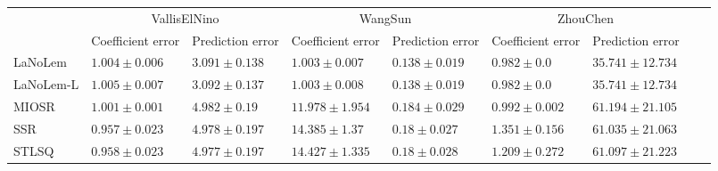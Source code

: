 \begin{table*}
{\begin{tabular}{lllllllll}
\midrule

 & \multicolumn{2}{c}{VallisElNino} & \multicolumn{2}{c}{WangSun} & \multicolumn{2}{c}{ZhouChen} \\
 & Coefficient error & Prediction error & Coefficient error & Prediction error & Coefficient error & Prediction error \\
\midrule
LaNoLem & $1.004\pm 0.006$ & $\mathbf{3.091}\pm 0.138$ & $\mathbf{1.003}\pm 0.007$ & $0.138\pm 0.019$ & $0.982\pm 0.0$ & $\mathbf{35.741}\pm 12.734$ \\
LaNoLem-L & $1.005\pm 0.007$ & $3.092\pm 0.137$ & $1.003\pm 0.008$ & $\mathbf{0.138}\pm 0.019$ & $\mathbf{0.982}\pm 0.0$ & $35.741\pm 12.734$ \\
MIOSR & $1.001\pm 0.001$ & $4.982\pm 0.19$ & $11.978\pm 1.954$ & $0.184\pm 0.029$ & $0.992\pm 0.002$ & $61.194\pm 21.105$ \\
SSR & $\mathbf{0.957}\pm 0.023$ & $4.978\pm 0.197$ & $14.385\pm 1.37$ & $0.18\pm 0.027$ & $1.351\pm 0.156$ & $61.035\pm 21.063$ \\
STLSQ & $0.958\pm 0.023$ & $4.977\pm 0.197$ & $14.427\pm 1.335$ & $0.18\pm 0.028$ & $1.209\pm 0.272$ & $61.097\pm 21.223$ \\

\bottomrule
\end{tabular}
}
\end{table*}
\begin{table*}
\centering
\caption{}
\label{}
\bottomrule
\end{tabular}
}
\end{table*}
